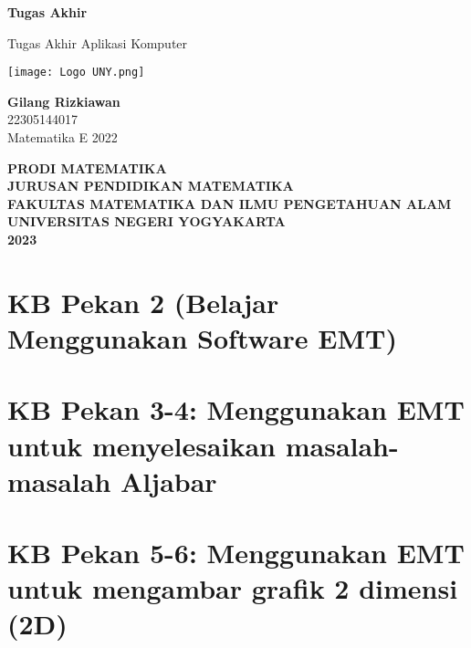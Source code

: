 \documentclass{report}
\begin{document}
\begin{titlepage}
    \begin{center}
        \vspace*{1cm}

        \Huge
        \textbf{Tugas Akhir}
        
        \vspace{0.5cm}
        
        \LARGE
        Tugas Akhir Aplikasi Komputer  
        
        \vspace{1cm}
        
        \texttt{[image: Logo UNY.png]}

        \vspace{1cm}
        
        \textbf{Gilang Rizkiawan}\\
        22305144017\\
        Matematika E 2022
        
        \vspace{2cm}
        
        \Large
        \textbf{PRODI MATEMATIKA}\\
        \textbf{JURUSAN PENDIDIKAN MATEMATIKA}\\
        \textbf{FAKULTAS MATEMATIKA DAN ILMU PENGETAHUAN ALAM}
        \textbf{UNIVERSITAS NEGERI YOGYAKARTA}\\
        \textbf{2023}
        
    \end{center}
\end{titlepage}

\newpage
\tableofcontents

\chapter{KB Pekan 2 (Belajar Menggunakan Software EMT)}


\newpage
\chapter{KB Pekan 3-4: Menggunakan EMT untuk menyelesaikan masalah-masalah Aljabar}


\newpage
\chapter{KB Pekan 5-6: Menggunakan EMT untuk mengambar grafik 2 dimensi (2D)}

\end{document}
